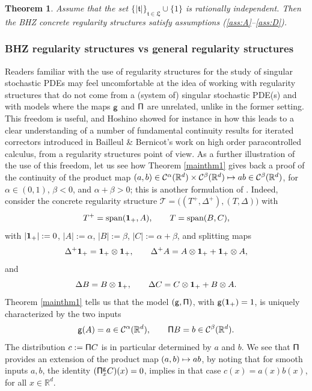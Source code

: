 \documentclass[10pt]{amsart}
\newcommand\mto{\mathchoice{\longmapsto}{\mapsto}{\mapsto}{\mapsto}}
\theoremstyle{plain}
\newtheorem{thm}{Theorem}
\theoremstyle{definition}
\newcommand{\bbR}{\mathbb{R}}
\newcommand{\mcC}{\mathcal{C}}
\begin{document}
\begin{thm} \label{mainthm3}
Assume that the set $\{|\mathfrak{t}|\}_{\mathfrak{t}\in\mathfrak{L}}\cup\{1\}$ is rationally independent. Then the \emph{BHZ} concrete regularity structures satisfy assumptions \textup{(\ref{ass:A}--\ref{ass:D})}.
\end{thm}

\subsubsection*{BHZ regularity structures vs general regularity structures}
Readers familiar with the use of regularity structures for the study of singular stochastic PDEs may feel uncomfortable at the idea of working with regularity structures that do not come from a (system of) singular stochastic PDE(s) and with models where the maps $\sf g$ and $\sf\Pi$ are unrelated, unlike in the former setting. This freedom is useful, and Hoshino showed for instance in \cite{HoshinoCommutator1, HoshinoCommutator2} how this leads to a clear understanding of a number of fundamental continuity results for iterated correctors introduced in Bailleul \& Bernicot's work \cite{BB16} on high order paracontrolled calculus, from a regularity structures point of view. As a further illustration of the use of this freedom, let us see how Theorem \ref{mainthm1} gives back a proof of the continuity of the product map $(a,b)\in \mcC^\alpha(\bbR^d)\times \mcC^\beta(\bbR^d) \mto ab\in \mcC^\beta(\bbR^d)$, for $\alpha\in(0,1)$, $\beta<0$, and $\alpha+\beta>0$; this is another formulation of \cite[Prop.\,4.14]{Hai}.
Indeed, consider the concrete regularity structure $\mathscr{T}=\bigl((T^+,\Delta^+), (T,\Delta)\bigr)$ with
\[
T^+ = \textrm{span}({\bf 1}_+, A), \qquad T = \textrm{span}(B,C),
\]
with $\vert{\bf1}_+\vert:=0$, $\vert A\vert:=\alpha$, $\vert B\vert:=\beta$, $\vert C\vert:=\alpha+\beta$, and splitting maps
\[
\Delta^+{\bf 1}_+ = {\bf 1}_+\otimes {\bf 1}_+, \qquad \Delta^+A = A\otimes{\bf 1}_+ + {\bf 1}_+\otimes A,
\]
and
\[
\Delta B = B\otimes {\bf 1}_+, \qquad \Delta C = C\otimes{\bf 1}_+ + B\otimes A.
\]
Theorem \ref{mainthm1} tells us that the model $\sf (g,\Pi)$, with ${\sf g}({\bf 1}_+)=1$, is uniquely characterized by the two inputs
\[
{\sf g}(A) = a\in \mcC^\alpha(\bbR^d), \qquad {\sf \Pi}B = b\in \mcC^\beta(\bbR^d).
\]
The distribution $c:={\sf \Pi}C$ is in particular determined by $a$ and $b$. We see that $\sf \Pi$ provides an extension of the product map $(a,b)\mto ab$, by noting that for smooth inputs $a,b$, the identity $({\sf \Pi}_x^{\sf g}C)(x)=0$, implies in that case $c(x)=a(x)b(x)$, for all $x\in\bbR^d$.
\end{document}
